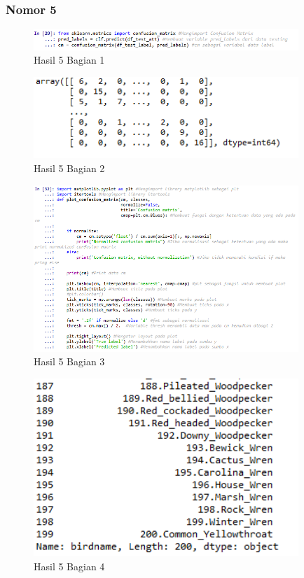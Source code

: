 \subsubsection{Nomor 5}
\hfill\break

\begin{figure}[H]
\centerline{\includegraphics[width=10cm]{figures/1174087/3/25.png}}
\caption{Hasil 5 Bagian 1}
\label{labelgambar}
\end{figure}


\begin{figure}[H]
\centerline{\includegraphics[width=10cm]{figures/1174087/3/26.png}}
\caption{Hasil 5 Bagian 2}
\label{labelgambar}
\end{figure}


\begin{figure}[H]
\centerline{\includegraphics[width=10cm]{figures/1174087/3/27.png}}
\caption{Hasil 5 Bagian 3}
\label{labelgambar}
\end{figure}


\begin{figure}[H]
\centerline{\includegraphics[width=10cm]{figures/1174087/3/28.png}}
\caption{Hasil 5 Bagian 4}
\label{labelgambar}
\end{figure}

